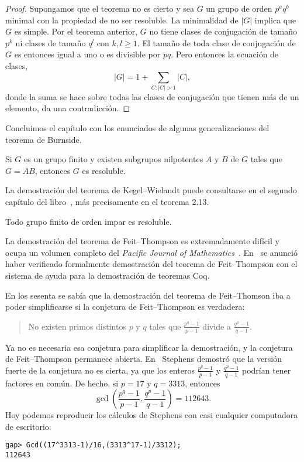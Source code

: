 \begin{proof}
	Supongamos que el teorema no es cierto y sea $G$ un grupo de orden $p^aq^b$
	minimal con la propiedad de no ser resoluble. La minimalidad de $|G|$
	implica que $G$ es simple. Por el teorema anterior, $G$ no tiene clases de
	conjugación de tamaño $p^k$ ni clases de tamaño $q^l$ con $k,l\geq1$. El
	tamaño de toda clase de conjugación de $G$ es entonces igual a uno o es
	divisible por $pq$. Pero entonces la ecuación de clases, 
	\[
		|G|=1+\sum_{C:|C|>1}|C|,
	\]
	donde la suma se hace sobre todas las clases de conjugación que tienen más
	de un elemento, da una contradicción.
\end{proof}

Concluimos el capítulo con los enunciados de algunas 
generalizaciones del teorema de Burnside. 

\begin{theorem}
Si $G$ es un grupo finito y existen subgrupos nilpotentes $A$ y $B$ de $G$ tales
que $G=AB$, entonces $G$ es resoluble. 
\end{theorem}

La demostración del teorema de Kegel--Wielandt puede consultarse en el segundo 
capítulo del libro~\cite{MR1211633}, más precisamente en el teorema 2.13. 

\begin{theorem}
Todo grupo finito de orden impar es resoluble. 
\end{theorem}

La demostración del teorema de Feit--Thompson es extremadamente difícil y ocupa un volumen completo del 
\emph{Pacific Journal of Mathematics}~\cite{MR166261}. 
En~\cite{MR3111271} se anunció haber verificado formalmente 
demostración del teorema de Feit--Thompson con el 
sistema de ayuda para la demostración de teoremas Coq. 

\medskip
{}
En los sesenta se sabía que la demostración del teorema de Feit--Thomson iba a poder simplificarse 
si la conjetura de Feit--Thompson es verdadera:

\begin{quote}
No existen primos distintos $p$ y $q$ tales que
$\frac {p^{q}-1}{p-1}$ divide a $\frac{q^{p} - 1}{q - 1}$. 
\end{quote}

Ya no es necesaria esa conjetura para simplificar la demostración, 
y la conjetura de Feit--Thompson permanece abierta. 
En~\cite{MR297686} 
Stephens demostró que la versión fuerte de la conjetura no es cierta, ya que 
los enteros $\frac {p^{q}-1}{p-1}$ y $\frac{q^{p} - 1}{q - 1}$ 
podrían tener factores en común. De hecho, si $p=17$ y $q=3313$, 
entonces 
\[
\gcd\left(\frac {p^{q}-1}{p-1},\frac{q^{p} - 1}{q - 1}\right)=112643.
\]
Hoy podemos reproducir los cálculos de 
Stephens con casi cualquier computadora de escritorio:
\begin{lstlisting}
gap> Gcd((17^3313-1)/16,(3313^17-1)/3312);
112643
\end{lstlisting}

